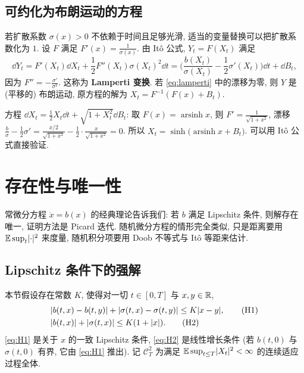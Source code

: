 \subsection{可约化为布朗运动的方程}

若扩散系数 $\sigma(x)>0$ 不依赖于时间且足够光滑, 适当的变量替换可以把扩散系数化为 $1$. 设 $F$ 满足 $F'(x)=\frac{1}{\sigma(x)}$. 由 It\^o 公式, $Y_t=F(X_t)$ 满足
\begin{equation}\label{eq:lamperti}
\dd Y_t=F'(X_t)\dd X_t+\frac{1}{2}F''(X_t)\sigma(X_t)^2\dd t=\Big(\frac{b(X_t)}{\sigma(X_t)}-\frac{1}{2}\sigma'(X_t)\Big)\dd t+\dd B_t,
\end{equation}
因为 $F''=-\frac{\sigma'}{\sigma^2}$. 这称为 \textbf{Lamperti 变换}. 若 \eqref{eq:lamperti} 中的漂移为零, 则 $Y$ 是 (平移的) 布朗运动, 原方程的解为 $X_t=F^{-1}(F(x)+B_t)$.

\begin{example}\label{ex:lamperti}
方程 $\dd X_t=\frac{1}{2}X_t\dd t+\sqrt{1+X_t^2}\dd B_t$: 取 $F(x)=\operatorname{arsinh}x$, 则 $F'=\frac{1}{\sqrt{1+x^2}}$, 漂移 $\frac{b}{\sigma}-\frac{1}{2}\sigma'=\frac{x/2}{\sqrt{1+x^2}}-\frac{1}{2}\cdot\frac{x}{\sqrt{1+x^2}}=0$. 所以 $X_t=\sinh\big(\operatorname{arsinh}x+B_t\big)$. 可以用 It\^o 公式直接验证.
\end{example}

\section{存在性与唯一性}
\label{sec:6-2}

常微分方程 $\dot{x}=b(x)$ 的经典理论告诉我们: 若 $b$ 满足 Lipschitz 条件, 则解存在唯一, 证明方法是 Picard 迭代. 随机微分方程的情形完全类似, 只是距离要用 $\mathbb{E}\sup_t\lvert\cdot\rvert^2$ 来度量, 随机积分项要用 Doob 不等式与 It\^o 等距来估计.

\subsection{Lipschitz 条件下的强解}

本节假设存在常数 $K$, 使得对一切 $t\in[0,T]$ 与 $x,y\in\mathbb{R}$,
\begin{align}
&\lvert b(t,x)-b(t,y)\rvert+\lvert\sigma(t,x)-\sigma(t,y)\rvert\le K\lvert x-y\rvert,\tag{H1}\label{eq:H1}\\
&\lvert b(t,x)\rvert+\lvert\sigma(t,x)\rvert\le K(1+\lvert x\rvert).\tag{H2}\label{eq:H2}
\end{align}
\eqref{eq:H1} 是关于 $x$ 的一致 Lipschitz 条件, \eqref{eq:H2} 是线性增长条件 (若 $b(t,0)$ 与 $\sigma(t,0)$ 有界, 它由 \eqref{eq:H1} 推出). 记 $\mathscr{C}^2_T$ 为满足 $\mathbb{E}\sup_{t\le T}\lvert X_t\rvert^2<\infty$ 的连续适应过程全体.


